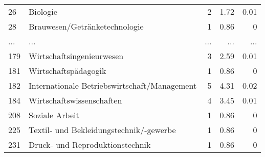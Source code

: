 \begin{longtable}{lXrrr}
        26 & \multicolumn{1}{X}{Biologie} & %
          \num{2} &
          \num[round-mode=places,round-precision=2]{1.72} &
          \num[round-mode=places,round-precision=2]{0.01} \\
        28 & \multicolumn{1}{X}{Brauwesen/Getränketechnologie} & %
          \num{1} &
          \num[round-mode=places,round-precision=2]{0.86} &
          \num[round-mode=places,round-precision=2]{0} \\
       ... & ... & ... & ... & ... \\
        179 & \multicolumn{1}{X}{Wirtschaftsingenieurwesen} & %
          \num{3} &
          \num[round-mode=places,round-precision=2]{2.59} &
          \num[round-mode=places,round-precision=2]{0.01} \\

        181 & \multicolumn{1}{X}{Wirtschaftspädagogik} & %
          \num{1} &
          \num[round-mode=places,round-precision=2]{0.86} &
          \num[round-mode=places,round-precision=2]{0} \\

        182 & \multicolumn{1}{X}{Internationale Betriebswirtschaft/Management} & %
          \num{5} &
          \num[round-mode=places,round-precision=2]{4.31} &
          \num[round-mode=places,round-precision=2]{0.02} \\

        184 & \multicolumn{1}{X}{Wirtschaftswissenschaften} & %
          \num{4} &
          \num[round-mode=places,round-precision=2]{3.45} &
          \num[round-mode=places,round-precision=2]{0.01} \\

        208 & \multicolumn{1}{X}{Soziale Arbeit} & %
          \num{1} &
          \num[round-mode=places,round-precision=2]{0.86} &
          \num[round-mode=places,round-precision=2]{0} \\

        225 & \multicolumn{1}{X}{Textil- und Bekleidungstechnik/-gewerbe} & %
          \num{1} &
          \num[round-mode=places,round-precision=2]{0.86} &
          \num[round-mode=places,round-precision=2]{0} \\

        231 & \multicolumn{1}{X}{Druck- und Reproduktionstechnik} & %
          \num{1} &
          \num[round-mode=places,round-precision=2]{0.86} &
          \num[round-mode=places,round-precision=2]{0} \\


\end{longtable}
